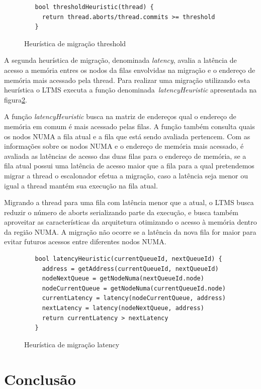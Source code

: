 \documentclass[diss,capa]{texufpel}
\begin{document}
\begin{figure}[htbp]
 \centering
 \begin{lstlisting}
   bool thresholdHeuristic(thread) {
     return thread.aborts/thread.commits >= threshold
   }
 \end{lstlisting}
 \caption{Heurística de migração threshold}
 \label{threshold}
\end{figure}

A segunda heurística de migração, denominada \emph{latency}, avalia a latência de acesso a memória entres os nodos da filas envolvidas na migração e o endereço de memória mais acessado pela thread. Para realizar uma migração utilizando esta heurística o LTMS executa a função denominada~\emph{latencyHeuristic} apresentada na figura\ref{latency}.

A função \emph{latencyHeuristic} busca na matriz de endereços qual o endereço de memória em comum é mais acessado pelas filas. A função também consulta quais os nodos NUMA a fila atual e a fila que está sendo avaliada pertencem. Com as informações sobre os nodos NUMA e o endereço de memória mais acessado, é avaliada as latências de acesso das duas filas para o endereço de memória, se a fila atual possui uma latência de acesso maior que a fila para a qual pretendemos migrar a thread o escalonador efetua a migração, caso a latência seja menor ou igual a thread mantém sua execução na fila atual.

Migrando a thread para uma fila com latência menor que a atual, o LTMS busca reduzir o número de aborts serializando parte da execução, e busca também aproveitar as características da arquitetura otimizando o acesso à memória dentro da região NUMA. A migração não ocorre se a latência da nova fila for maior para evitar futuros acessos entre diferentes nodos NUMA.

\begin{figure}[htbp]
 \centering
 \begin{lstlisting}
   bool latencyHeuristic(currentQueueId, nextQueueId) {
     address = getAddress(currentQueueId, nextQueueId)
     nodeNextQueue = getNodeNuma(nextQueueId.node)
     nodeCurrentQueue = getNodeNuma(currentQueueId.node)
     currentLatency = latency(nodeCurrentQueue, address)
     nextLatency = latency(nodeNextQueue, address)
     return currentLatency > nextLatency
   }
 \end{lstlisting}
 \caption{Heurística de migração latency}
\label{latency}
\end{figure}

\section{Conclusão}
\end{document}
